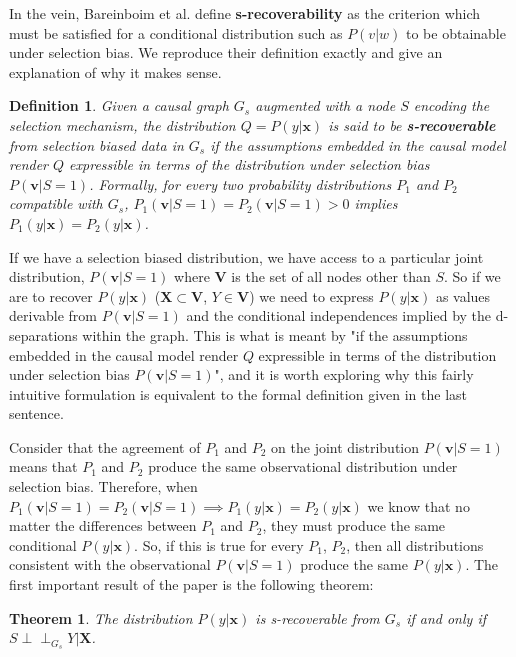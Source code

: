 \documentclass[12pt]{article}
\newtheorem{theorem}{Theorem}
\newtheorem{definition}{Definition}[section]
\theoremstyle{definition}
\newcommand{\dsep}{\perp \!\!\!\perp}
\begin{document}
In the vein, Bareinboim et al. define \textbf{s-recoverability} as the criterion which must be satisfied for a conditional distribution such as $P(v|w)$ to be obtainable under selection bias. We reproduce their definition exactly and give an explanation of why it makes sense.

\begin{definition}
Given a causal graph $G_s$ augmented with a node $S$ encoding the selection mechanism, the distribution $Q = P(y | \mathbf{x})$ is said to be \textbf{s-recoverable} from selection biased data in $G_s$ if the assumptions embedded in the causal model render $Q$ expressible in terms of the distribution under selection bias $P(\mathbf{v} | S = 1)$. Formally, for every two probability distributions $P_1$ and $P_2$ compatible with $G_s$, $P_1(\mathbf{v} | S = 1) = P_2(\mathbf{v} | S = 1) > 0$ implies $P_1(y | \mathbf{x}) = P_2(y | \mathbf{x})$.
\end{definition}

If we have a selection biased distribution, we have access to a particular joint distribution, $P(\mathbf{v} | S = 1)$ where $\mathbf{V}$ is the set of all nodes other than $S$. So if we are to recover $P(y | \mathbf{x})$ ($\mathbf{X} \subset \mathbf{V}$, $Y \in \mathbf{V}$) we need to express $P(y | \mathbf{x})$ as values derivable from $P(\mathbf{v} | S = 1)$ and the conditional independences implied by the d-separations within the graph. This is what is meant by "if the assumptions embedded in the causal model render $Q$ expressible in terms of the distribution under selection bias $P(\mathbf{v} | S = 1)$", and it is worth exploring why this fairly intuitive formulation is equivalent to the formal definition given in the last sentence.

Consider that the agreement of $P_1$ and $P_2$ on the joint distribution $P(\mathbf{v} | S = 1)$ means that $P_1$ and $P_2$ produce the same observational distribution under selection bias. Therefore, when $P_1(\mathbf{v} | S = 1) = P_2(\mathbf{v} | S = 1) \implies P_1(y | \mathbf{x}) = P_2(y | \mathbf{x})$ we know that no matter the differences between $P_1$ and $P_2$, they must produce the same conditional $P(y|\mathbf{x})$. So, if this is true for every $P_1$, $P_2$, then all distributions consistent with the observational $P(\mathbf{v} | S = 1)$ produce the same $P(y | \mathbf{x})$. 
The first important result of the paper is the following theorem:
\begin{theorem}
The distribution $P(y | \mathbf{x})$ is s-recoverable from $G_s$ if and only if $S \dsep_{G_s} Y | \mathbf{X}$.
\end{theorem}
\end{document}
